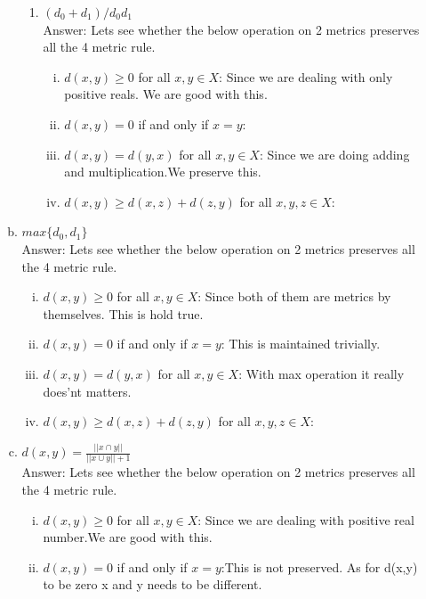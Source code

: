 \documentclass{article}
\begin{document}
\begin{enumerate}
\begin{enumerate}[(a)]
\begin{enumerate}
	
				\item  $(d_0 + d_1)/d_{0}d_{1}$ \\
				Answer: Lets see whether the below operation on 2 metrics preserves all the 4 metric rule. \\	
			\begin{enumerate}[(i)]
			\item $d(x, y) \ge 0$ for all $x, y \in X$: Since we are dealing with only positive reals. We are good with this.
			\item $d(x, y) = 0$ if and only if  $x = y$: 
			\item $d(x, y) = d(y, x)$ for all $x, y \in X$:  Since we are doing adding and multiplication.We preserve this.
			\item $d(x, y) \ge d(x, z) + d(z, y)$ for all $x, y, z \in X$: \\
			\end{enumerate}
		
			\end{enumerate}
			
			\item  $max\{d_0,d_1\}$ \\
			Answer: Lets see whether the below operation on 2 metrics preserves all the 4 metric rule. \\	
			\begin{enumerate}[(i)]
			\item $d(x, y) \ge 0$ for all $x, y \in X$: Since both of them are metrics by themselves. This is hold true.
			\item $d(x, y) = 0$ if and only if  $x = y$: This is maintained trivially.
			\item $d(x, y) = d(y, x)$ for all $x, y \in X$:  With max operation it really does'nt matters.
			\item $d(x, y) \ge d(x, z) + d(z, y)$ for all $x, y, z \in X$: \\
			\end{enumerate}			
			
			
			\item  $d(x,y) =  \frac{||x \cap y||}{||x \cup y|| + 1} $ \\
			Answer: Lets see whether the below operation on 2 metrics preserves all the 4 metric rule. \\	
			\begin{enumerate}[(i)]
			\item $d(x, y) \ge 0$ for all $x, y \in X$: Since we are dealing with positive real number.We are good with this.
			\item $d(x, y) = 0$ if and only if  $x = y$:This is not preserved. As for d(x,y) to be zero x and y needs to be different.


\end{enumerate}
\end{enumerate}
\end{enumerate}
\end{document}
